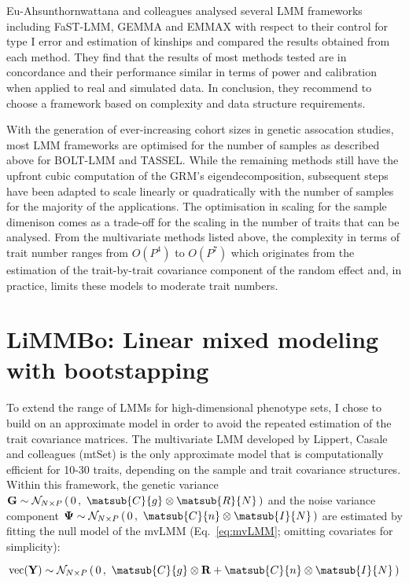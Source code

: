 Eu-Ahsunthornwattana and colleagues \citeyear{Eu-ahsunthornwattana2014} analysed several LMM frameworks including FaST-LMM, GEMMA and EMMAX with respect to their control for type I error and estimation of kinships and compared the results obtained from each method. They find that the results of most methods tested are in concordance and their performance similar in terms of power and calibration when applied to real and simulated data. In conclusion, they recommend to choose a framework based on complexity and data structure requirements. 

With the generation of ever-increasing cohort sizes in genetic assocation studies, most LMM frameworks are optimised for the number of samples as described above for BOLT-LMM and TASSEL. While the remaining methods still have the upfront cubic computation of the GRM's eigendecomposition, subsequent steps have been adapted to scale linearly or quadratically with the number of samples for the majority of the applications. The optimisation in scaling for the sample dimenison comes as a trade-off for the scaling in the number of traits that can be analysed. From the multivariate methods listed above, the complexity in terms of trait number ranges from \(O(P^4)\) to \(O(P^7)\) which originates from the estimation of the trait-by-trait covariance component of the random effect and, in practice, limits these models to moderate trait numbers.

\section{LiMMBo: Linear mixed modeling with bootstapping}
\label{section:intro-limmbo}
To extend the range of LMMs for high-dimensional phenotype sets, I chose to build on an approximate model in order to avoid the repeated estimation of the trait covariance matrices. The multivariate LMM developed by Lippert, Casale and colleagues (mtSet) \citeyear{Lippert2014,Casale2015} is the only approximate model that is computationally efficient for 10-30 traits, depending on the sample and trait covariance structures. Within this framework, the genetic variance \(\mat{G} \sim \multinormal N P 0 {\matsub{C}{g} \otimes \matsub{R}{N}}\) and the noise variance component \(\mat{\Psi} \sim \multinormal N P 0 {\matsub{C}{n} \otimes \matsub{I}{N}}\) are estimated by fitting the null model of the mvLMM (Eq.~\ref{eq:mvLMM}; omitting covariates for simplicity):

\begin{equation}
\text{vec}(\mat{Y}) \sim \multinormal N P 0 {\matsub{C}{g} \otimes \mat{R} + \matsub{C}{n} \otimes \matsub{I}{N}}
\label{eq:vd}
\end{equation}

